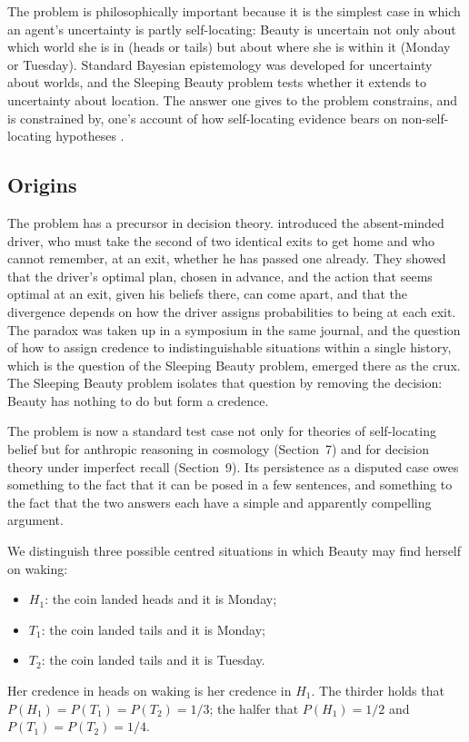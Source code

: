 \documentclass{situationist-preprint}
\begin{document}
The problem is philosophically important because it is the simplest case in which an agent's uncertainty is partly self-locating: Beauty is uncertain not only about which world she is in (heads or tails) but about where she is within it (Monday or Tuesday). Standard Bayesian epistemology was developed for uncertainty about worlds, and the Sleeping Beauty problem tests whether it extends to uncertainty about location. The answer one gives to the problem constrains, and is constrained by, one's account of how self-locating evidence bears on non-self-locating hypotheses \citep{Elga2004,Titelbaum2013}.

\subsection{Origins}

The problem has a precursor in decision theory. \citet{PiccioneRubinstein1997} introduced the absent-minded driver, who must take the second of two identical exits to get home and who cannot remember, at an exit, whether he has passed one already. They showed that the driver's optimal plan, chosen in advance, and the action that seems optimal at an exit, given his beliefs there, can come apart, and that the divergence depends on how the driver assigns probabilities to being at each exit. The paradox was taken up in a symposium in the same journal, and the question of how to assign credence to indistinguishable situations within a single history, which is the question of the Sleeping Beauty problem, emerged there as the crux. The Sleeping Beauty problem isolates that question by removing the decision: Beauty has nothing to do but form a credence.

The problem is now a standard test case not only for theories of self-locating belief but for anthropic reasoning in cosmology (Section~7) and for decision theory under imperfect recall (Section~9). Its persistence as a disputed case owes something to the fact that it can be posed in a few sentences, and something to the fact that the two answers each have a simple and apparently compelling argument.

We distinguish three possible centred situations in which Beauty may find herself on waking:
\begin{itemize}
\item $H_1$: the coin landed heads and it is Monday;
\item $T_1$: the coin landed tails and it is Monday;
\item $T_2$: the coin landed tails and it is Tuesday.
\end{itemize}
Her credence in heads on waking is her credence in $H_1$. The thirder holds that $P(H_1) = P(T_1) = P(T_2) = 1/3$; the halfer that $P(H_1) = 1/2$ and $P(T_1) = P(T_2) = 1/4$.
\end{document}
